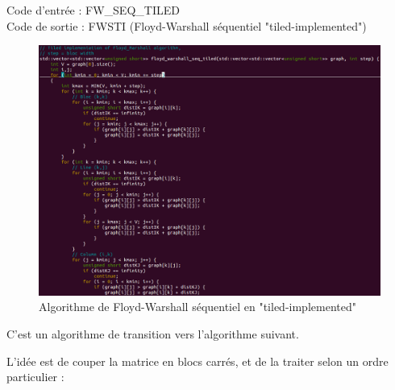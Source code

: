 \documentclass[a4paper,11pt]{article}
\begin{document}
\noindent Code d'entrée : FW\_SEQ\_TILED \\
Code de sortie : FWSTI (Floyd-Warshall séquentiel "tiled-implemented")

\begin{figure}[H]
\begin{center}
  \includegraphics[scale=0.6]{FW_SEQ_TILED.png}
  \caption{Algorithme de Floyd-Warshall séquentiel en "tiled-implemented"}
\end{center}
\end{figure}

C'est un algorithme de transition vers l'algorithme suivant.

L'idée est de couper la matrice en blocs carrés, et de la traiter selon un ordre particulier :
\end{document}
